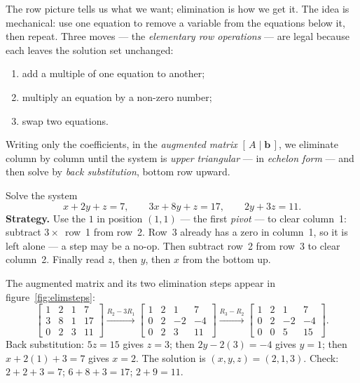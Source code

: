 The row picture tells us what we want; elimination is how we get it. The idea is mechanical: use one equation to remove a variable from the equations below it, then repeat. Three moves — the \emph{elementary row operations} — are legal because each leaves the solution set unchanged:
\begin{enumerate}
  \item add a multiple of one equation to another;
  \item multiply an equation by a non-zero number;
  \item swap two equations.
\end{enumerate}
Writing only the coefficients, in the \emph{augmented matrix} $[\,A\mid\mathbf{b}\,]$, we eliminate column by column until the system is \emph{upper triangular} — in \emph{echelon form} — and then solve by \emph{back substitution}, bottom row upward.

\begin{example}\label{ex:threesys}
Solve the system
\[
  x + 2y + z = 7,\qquad
  3x + 8y + z = 17,\qquad
  2y + 3z = 11.
\]
\textbf{Strategy.} Use the $1$ in position $(1,1)$ — the first \emph{pivot} — to clear column~1: subtract $3\times$~row~1 from row~2. Row~3 already has a zero in column~1, so it is left alone — a step may be a no-op. Then subtract row~2 from row~3 to clear column~2. Finally read $z$, then $y$, then $x$ from the bottom up.
\begin{solution}
The augmented matrix and its two elimination steps appear in figure~\ref{fig:elimsteps}:
\[
  \left[\begin{array}{ccc|c} 1 & 2 & 1 & 7\\ 3 & 8 & 1 & 17\\ 0 & 2 & 3 & 11\end{array}\right]
  \xrightarrow{R_2-3R_1}
  \left[\begin{array}{ccc|c} 1 & 2 & 1 & 7\\ 0 & 2 & -2 & -4\\ 0 & 2 & 3 & 11\end{array}\right]
  \xrightarrow{R_3-R_2}
  \left[\begin{array}{ccc|c} 1 & 2 & 1 & 7\\ 0 & 2 & -2 & -4\\ 0 & 0 & 5 & 15\end{array}\right].
\]
Back substitution: $5z=15$ gives $z=3$; then $2y - 2(3) = -4$ gives $y=1$; then $x + 2(1) + 3 = 7$ gives $x=2$. The solution is $(x,y,z)=(2,1,3)$. Check: $2+2+3=7$; $6+8+3=17$; $2+9=11$. \checkmark
\end{solution}
\end{example}

